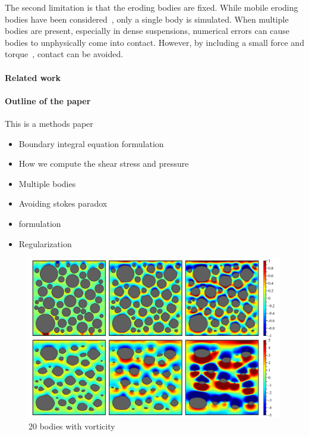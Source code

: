 \documentclass[preprint, 10pt]{elsarticle}
\begin{document}
The second limitation is that the eroding bodies are fixed.  While
mobile eroding bodies have been considered~\cite{Mitchell2016}, only a
single body is simulated.  When multiple bodies are present, especially
in dense suspensions, numerical errors can cause bodies to unphysically
come into contact.  However, by including a small force and
torque~\cite{lu-rah-zor2017}, contact can be avoided.

\paragraph{Related work}


\paragraph{Outline of the paper}

This is a methods paper
\begin{itemize}
  \item Boundary integral equation formulation
  \item How we compute the shear stress and pressure
  \item Multiple bodies
  \item Avoiding stokes paradox
  \item {\thL} formulation
  \item Regularization
\end{itemize}


\begin{figure}%
\begin{center}
\includegraphics[width = 0.9 \textwidth]{./figs/50bod.pdf}
\caption{20 bodies with vorticity}
\label{}
\end{center}
\end{figure}
\end{document}
